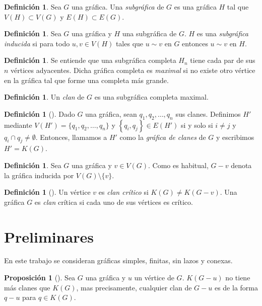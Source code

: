 \documentclass[12pt]{book}
\theoremstyle{definition}
\newtheorem{proposition}[theorem]{Proposición}
\newtheorem{definition}[theorem]{Definición}
\begin{document}
\begin{definition}
Sea $G$ una gráfica. Una \emph{subgráfica} de $G$ es una gráfica $H$ tal que $V(H)\subset V(G)$ y $E(H)\subset E(G)$.
\end{definition}

\begin{definition}
Sea $G$ una gráfica y $H$ una subgráfica de $G$. $H$ es una \emph{subgráfica inducida} si para todo $u,v\in V(H)$ tales que $u\sim v$ en $G$ entonces $u\sim v$ en $H$.
\end{definition}

\begin{definition}
Se entiende que una subgráfica completa $H_n$ tiene cada par de sus $n$ vértices adyacentes. Dicha gráfica completa es \emph{maximal} si no existe otro vértice en la gráfica tal que forme una completa más grande.
\end{definition}

\begin{definition}
Un \emph{clan} de $G$ es una subgráfica completa maximal. 
\end{definition}

\begin{definition}[\citealt{Hamelink:1968}]
Dado $G$ una gráfica, sean $q_1, q_2, \dots, q_n $ sus clanes. Definimos $H'$ mediante $ V(H') = \{q_1, q_2, \dots, q_n\}$ y $\left\{q_i, q_j\right\}\in E(H')$ si y solo si $i \neq j$ y $q_i \cap q_j \neq \emptyset$.  
Entonces, llamamos a $H'$ como la \emph{gráfica de clanes} de $G$ y escribimos $H'=K(G)$.
\end{definition}

\begin{definition}
Sea $G$ una gráfica y $v \in V(G)$. Como es habitual, $G-v$ denota la gráfica inducida por $V(G)\setminus \{v\}$.  
\end{definition}

\begin{definition}[\citealt{Escalante:1974}]
Un vértice $v$ es \emph{clan crítico} si $K(G)\neq K(G-v)$. Una gráfica $G$ es \emph{clan} crítica si cada uno de sus vértices es crítico.
\end{definition}

\section{Preliminares}
En este trabajo se consideran gráficas simples, finitas, sin lazos y conexas.

\begin{proposition}[\citealt{Escalante:1974}]\label{P1.14}
Sea $G$ una gráfica y $u$ un vértice de $G$. $K(G-u)$ no tiene más clanes que $K(G)$, mas precisamente, cualquier clan de $G-u$ es de la forma $q-u$ para $q\in K(G)$.
\end{proposition}
\end{document}
